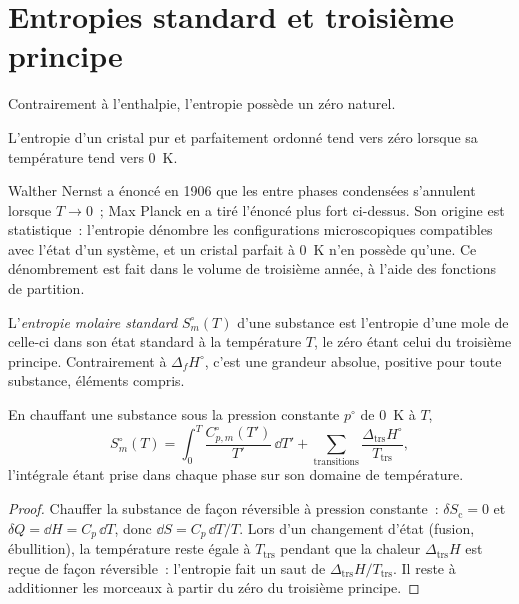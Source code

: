 \section{Entropies standard et troisième principe}

Contrairement à l'enthalpie, l'entropie possède un zéro naturel.

\begin{theorem}\label{thm:b2:reaction-free-energy:third-law}
L'entropie d'un cristal pur et parfaitement ordonné tend vers zéro lorsque sa
température tend vers \qty{0}{K}.
\end{theorem}
\admitted

\begin{remark}\label{rem:b2:reaction-free-energy:third-law}
Walther Nernst a énoncé en 1906 que les  entre phases
condensées s'annulent lorsque $T \to 0$~; Max Planck en a tiré l'énoncé plus fort
ci-dessus. Son origine est statistique~: l'entropie dénombre les configurations
microscopiques compatibles avec l'état d'un système, et un cristal parfait
à \qty{0}{K} n'en possède qu'une. Ce dénombrement est fait dans le volume de troisième année,
à l'aide des fonctions de partition.
\end{remark}

\begin{definition}\label{def:b2:reaction-free-energy:standard-entropy}
L'\emph{entropie molaire standard}
$S^\circ_m(T)$ d'une substance est l'entropie d'une mole de celle-ci dans son
état standard à la température $T$, le zéro étant celui du troisième principe.
Contrairement à $\Delta_f H^\circ$, c'est une grandeur absolue, positive pour toute
substance, éléments compris.
\end{definition}

\begin{proposition}\label{prop:b2:reaction-free-energy:absolute-entropy}
En chauffant une substance sous la pression constante $p^\circ$ de \qty{0}{K} à $T$,
\[
  S^\circ_m(T) = \int_0^T\frac{C^\circ_{p,m}(T')}{T'}\,\dd T' +
  \sum_{\text{transitions}}\frac{\Delta_{\text{trs}}H^\circ}{T_{\text{trs}}} ,
\]
l'intégrale étant prise dans chaque phase sur son domaine de température.
\end{proposition}

\begin{proof}
Chauffer la substance de façon réversible à pression constante~: $\delta S_{\text{c}} =
0$ et $\delta Q = \dd H = C_p\,\dd T$, donc $\dd S = C_p\,\dd T/T$. Lors d'un
changement d'état (fusion, ébullition), la température reste égale à $T_{\text{trs}}$
pendant que la chaleur $\Delta_{\text{trs}}H$ est reçue de façon réversible~: l'entropie
fait un saut de $\Delta_{\text{trs}}H/T_{\text{trs}}$. Il reste à additionner les morceaux à partir du
zéro du troisième principe.
\end{proof}


